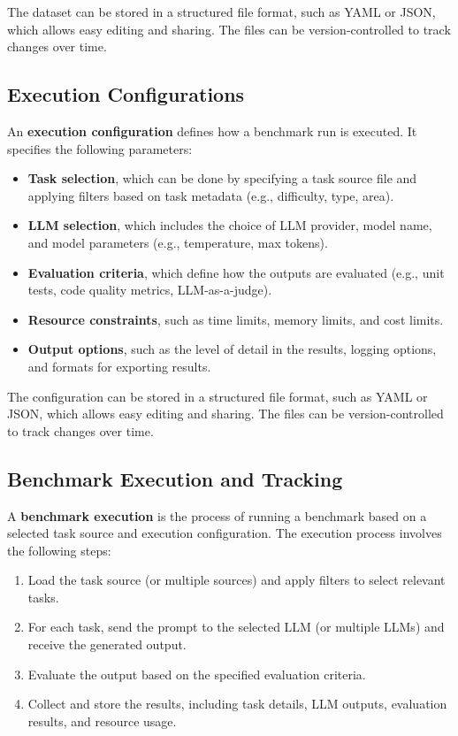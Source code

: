 The dataset can be stored in a structured file format, such as YAML or JSON, which allows easy editing and sharing.
The files can be version-controlled to track changes over time.

\subsection{Execution Configurations}

An \textbf{execution configuration} defines how a benchmark run is executed.
It specifies the following parameters:
\begin{itemize}
    \item \textbf{Task selection}, which can be done by specifying a task source file and applying filters based on task metadata (e.g., difficulty, type, area).
    \item \textbf{LLM selection}, which includes the choice of LLM provider, model name, and model parameters (e.g., temperature, max tokens).
    \item \textbf{Evaluation criteria}, which define how the outputs are evaluated (e.g., unit tests, code quality metrics, LLM-as-a-judge).
    \item \textbf{Resource constraints}, such as time limits, memory limits, and cost limits.
    \item \textbf{Output options}, such as the level of detail in the results, logging options, and formats for exporting results.
\end{itemize}

The configuration can be stored in a structured file format, such as YAML or JSON, which allows easy editing and sharing.
The files can be version-controlled to track changes over time.

\subsection{Benchmark Execution and Tracking}
A \textbf{benchmark execution} is the process of running a benchmark based on a selected task source and execution configuration.
The execution process involves the following steps:
\begin{enumerate}
    \item Load the task source (or multiple sources) and apply filters to select relevant tasks.
    \item For each task, send the prompt to the selected LLM (or multiple LLMs) and receive the generated output.
    \item Evaluate the output based on the specified evaluation criteria.
    \item Collect and store the results, including task details, LLM outputs, evaluation results, and resource usage.
\end{enumerate}

